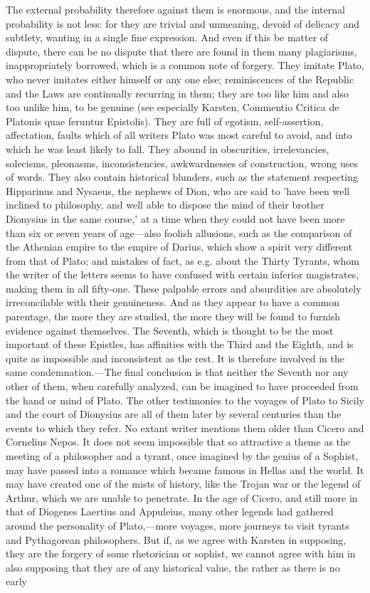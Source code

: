 \documentclass[11pt,letter]{article}
\begin{document}
\par  The external probability therefore against them is enormous, and the internal probability is not less: for they are trivial and unmeaning, devoid of delicacy and subtlety, wanting in a single fine expression. And even if this be matter of dispute, there can be no dispute that there are found in them many plagiarisms, inappropriately borrowed, which is a common note of forgery. They imitate Plato, who never imitates either himself or any one else; reminiscences of the Republic and the Laws are continually recurring in them; they are too like him and also too unlike him, to be genuine (see especially Karsten, Commentio Critica de Platonis quae feruntur Epistolis). They are full of egotism, self-assertion, affectation, faults which of all writers Plato was most careful to avoid, and into which he was least likely to fall. They abound in obscurities, irrelevancies, solecisms, pleonasms, inconsistencies, awkwardnesses of construction, wrong uses of words. They also contain historical blunders, such as the statement respecting Hipparinus and Nysaeus, the nephews of Dion, who are said to 'have been well inclined to philosophy, and well able to dispose the mind of their brother Dionysius in the same course,' at a time when they could not have been more than six or seven years of age—also foolish allusions, such as the comparison of the Athenian empire to the empire of Darius, which show a spirit very different from that of Plato; and mistakes of fact, as e.g. about the Thirty Tyrants, whom the writer of the letters seems to have confused with certain inferior magistrates, making them in all fifty-one. These palpable errors and absurdities are absolutely irreconcilable with their genuineness. And as they appear to have a common parentage, the more they are studied, the more they will be found to furnish evidence against themselves. The Seventh, which is thought to be the most important of these Epistles, has affinities with the Third and the Eighth, and is quite as impossible and inconsistent as the rest. It is therefore involved in the same condemnation.—The final conclusion is that neither the Seventh nor any other of them, when carefully analyzed, can be imagined to have proceeded from the hand or mind of Plato. The other testimonies to the voyages of Plato to Sicily and the court of Dionysius are all of them later by several centuries than the events to which they refer. No extant writer mentions them older than Cicero and Cornelius Nepos. It does not seem impossible that so attractive a theme as the meeting of a philosopher and a tyrant, once imagined by the genius of a Sophist, may have passed into a romance which became famous in Hellas and the world. It may have created one of the mists of history, like the Trojan war or the legend of Arthur, which we are unable to penetrate. In the age of Cicero, and still more in that of Diogenes Laertius and Appuleius, many other legends had gathered around the personality of Plato,—more voyages, more journeys to visit tyrants and Pythagorean philosophers. But if, as we agree with Karsten in supposing, they are the forgery of some rhetorician or sophist, we cannot agree with him in also supposing that they are of any historical value, the rather as there is no early 
\end{document}
